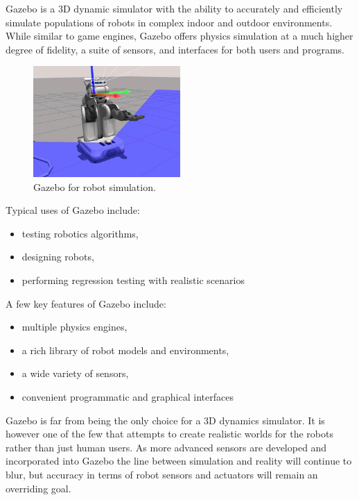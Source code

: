 Gazebo is a 3D dynamic simulator with the ability to accurately and efficiently simulate populations of robots in complex indoor and outdoor environments. While similar to game engines, Gazebo offers physics simulation at a much higher degree of fidelity, a suite of sensors, and interfaces for both users and programs.

\begin{figure}[h]
\centering
\includegraphics[width=0.5\textwidth]{figs/ch2/osrf.jpeg}
\caption{Gazebo for robot simulation.}
\end{figure}

Typical uses of Gazebo include:

\begin{itemize}

\item testing robotics algorithms,

\item designing robots,

\item performing regression testing with realistic scenarios

\end{itemize}

A few key features of Gazebo include:

\begin{itemize}

\item multiple physics engines,

\item a rich library of robot models and environments,

\item a wide variety of sensors,

\item convenient programmatic and graphical interfaces

\end{itemize}

Gazebo is far from being the only choice for a 3D dynamics simulator. It is however one of the few that attempts to create realistic worlds for the robots rather than just human users. As more advanced sensors are developed and incorporated into Gazebo the line between simulation and reality will continue to blur, but accuracy in terms of robot sensors and actuators will remain an overriding goal.

